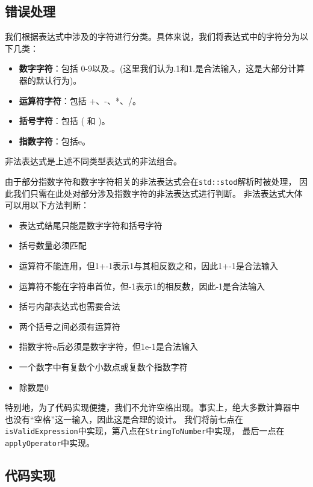 \documentclass[UTF8]{ctexart}
\begin{document}
\subsection{错误处理}
我们根据表达式中涉及的字符进行分类。具体来说，我们将表达式中的字符分为以下几类：
\begin{itemize}
    \item \textbf{数字字符}：包括 0-9以及.。(这里我们认为.1和1.是合法输入，这是大部分计算器的默认行为)。
    \item \textbf{运算符字符}：包括 +、-、*、/。
    \item \textbf{括号字符}：包括 ( 和 )。
    \item \textbf{指数字符}：包括e。
\end{itemize}
非法表达式是上述不同类型表达式的非法组合。\par
由于部分指数字符和数字字符相关的非法表达式会在\texttt{std::stod}解析时被处理，
因此我们只需在此处对部分涉及指数字符的非法表达式进行判断。
非法表达式大体可以用以下方法判断：
\begin{itemize}
    \item 表达式结尾只能是数字字符和括号字符
    \item 括号数量必须匹配
    \item 运算符不能连用，但1+-1表示1与其相反数之和，因此1+-1是合法输入
    \item 运算符不能在字符串首位，但-1表示1的相反数，因此-1是合法输入
    \item 括号内部表达式也需要合法
    \item 两个括号之间必须有运算符
    \item 指数字符e后必须是数字字符，但1e-1是合法输入
    \item 一个数字中有复数个小数点或复数个指数字符
    \item 除数是0
\end{itemize}
特别地，为了代码实现便捷，我们不允许空格出现。事实上，绝大多数计算器中
也没有“空格”这一输入，因此这是合理的设计。
我们将前七点在\texttt{isValidExpression}中实现，第八点在\texttt{StringToNumber}中实现，
最后一点在\texttt{applyOperator}中实现。
\subsection{代码实现}
\end{document}
